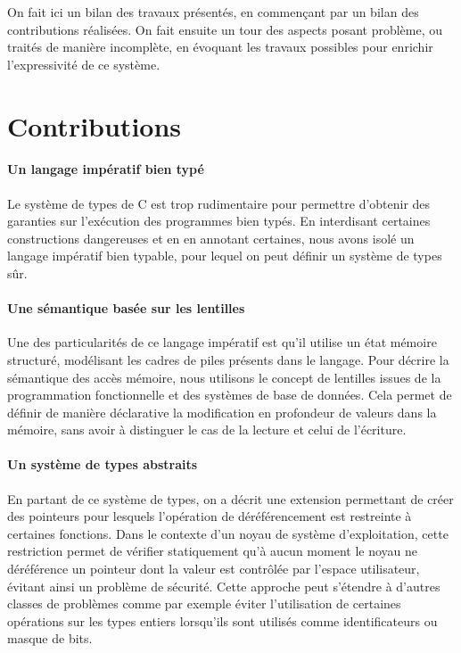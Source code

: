On fait ici un bilan des travaux présentés, en commençant par un bilan des
contributions réalisées. On fait ensuite un tour des aspects posant problème, ou
traités de manière incomplète, en évoquant les travaux possibles pour enrichir
l'expressivité de ce système.


\section{Contributions}

\paragraph{Un langage impératif bien typé}

Le système de types de C est trop rudimentaire pour permettre d'obtenir des
garanties sur l'exécution des programmes bien typés. En interdisant certaines
constructions dangereuses et en en annotant certaines, nous avons isolé un
langage impératif bien typable, pour lequel on peut définir un système de types
sûr.

\paragraph{Une sémantique basée sur les lentilles}

Une des particularités de ce langage impératif est qu'il utilise un état mémoire
structuré, modélisant les cadres de piles présents dans le langage. Pour décrire
la sémantique des accès mémoire, nous utilisons le concept de lentilles issues
de la programmation fonctionnelle et des systèmes de base de données. Cela
permet de définir de manière déclarative la modification en profondeur de
valeurs dans la mémoire, sans avoir à distinguer le cas de la lecture et celui
de l'écriture.


\paragraph{Un système de types abstraits}

En partant de ce système de types, on a décrit une extension permettant de créer
des pointeurs pour lesquels l'opération de déréférencement est restreinte à
certaines fonctions. Dans le contexte d'un noyau de système d'exploitation,
cette restriction permet de vérifier statiquement qu'à aucun moment le noyau ne
déréférence un pointeur dont la valeur est contrôlée par l'espace utilisateur,
évitant ainsi un problème de sécurité. Cette approche peut s'étendre à d'autres
classes de problèmes comme par exemple éviter l'utilisation de certaines
opérations sur les types entiers lorsqu'ils sont utilisés comme identificateurs
ou masque de bits.

